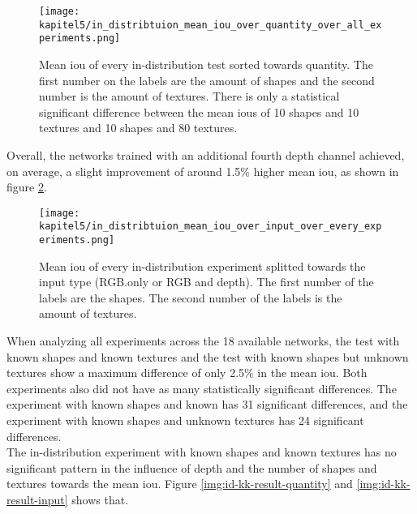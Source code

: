 			\FloatBarrier
			\begin{figure}[h]
				\centering
				\texttt{[image: kapitel5/in\_distribtuion\_mean\_iou\_over\_quantity\_over\_all\_experiments.png]}
				\caption[Mean \ac{iou} of every in-distribution test sorted towards quantity. The first number on the labels are the amount of shapes and the second number is the amount of textures. There is only a statistical significant difference between the mean \ac{iou}s of 10 shapes and 10 textures and 10 shapes and 80 textures.]{Mean \ac{iou} of every in-distribution test sorted towards quantity. The first number on the labels are the amount of shapes and the second number is the amount of textures. There is only a statistical significant difference between the mean \ac{iou}s of 10 shapes and 10 textures and 10 shapes and 80 textures.}
				\label{img:id-result-quantity}
			\end{figure}
			
			Overall, the networks trained with an additional fourth depth channel achieved, on average, a slight improvement of around 1.5\% higher mean \ac{iou}, as shown in figure \ref{img:id-result-input}.
			
			\begin{figure}[h]
				\centering
				\texttt{[image: kapitel5/in\_distribtuion\_mean\_iou\_over\_input\_over\_every\_experiments.png]}
				\caption[Mean \ac{iou} of every in-distribution experiment splitted towards the input type (RGB.only or RGB and depth). The first number of the labels are the shapes. The second number of the labels is the amount of textures.]{Mean \ac{iou} of every in-distribution experiment splitted towards the input type (RGB.only or RGB and depth). The first number of the labels are the shapes. The second number of the labels is the amount of textures.}
				\label{img:id-result-input}
			\end{figure}
			
			\FloatBarrier
			
			When analyzing all experiments across the 18 available networks, the test with known shapes and known textures and the test with known shapes but unknown textures show a maximum difference of only 2.5\% in the mean \ac{iou}. Both experiments also did not have as many statistically significant differences. The experiment with known shapes and known has 31 significant differences, and the experiment with known shapes and unknown textures has 24 significant differences.\\
			The in-distribution experiment with known shapes and known textures has no significant pattern in the influence of depth and the number of shapes and textures towards the mean \ac{iou}. Figure \ref{img:id-kk-result-quantity} and \ref{img:id-kk-result-input} shows that.
			
